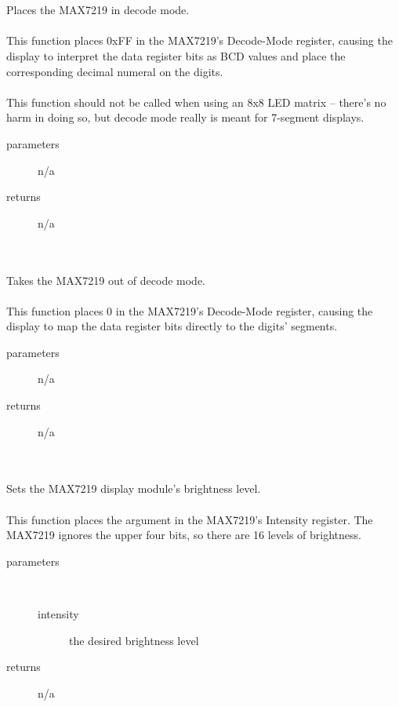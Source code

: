 \begin{itemize}
{             \\ \\
                Places the MAX7219 in decode mode. \\ \\
                This function places 0xFF in the MAX7219's Decode-Mode register, causing the display to interpret the data register bits as BCD values and place the corresponding decimal numeral on the digits. \\ \\
                This function should not be called when using an 8x8 LED matrix – there's no harm in doing so, but decode mode really is meant for 7-segment displays.
                \begin{description}
                    \item[parameters] n/a
                    \item[returns] n/a
                \end{description}

             \\ \\
                Takes the MAX7219 out of decode mode. \\ \\
                This function places 0 in the MAX7219's Decode-Mode register, causing the display to map the data register bits directly to the digits' segments.
                \begin{description}
                    \item[parameters] n/a
                    \item[returns] n/a
                \end{description}

             \\ \\
                Sets the MAX7219 display module's brightness level. \\ \\
                This function places the argument in the MAX7219's Intensity register.
                The MAX7219 ignores the upper four bits, so there are 16 levels of brightness.
                \begin{description}
                    \item[parameters] \
                    \begin{description}
                        \item[intensity] the desired brightness level
                    \end{description}
                    \item[returns] n/a
                \end{description}

}
\end{itemize}
